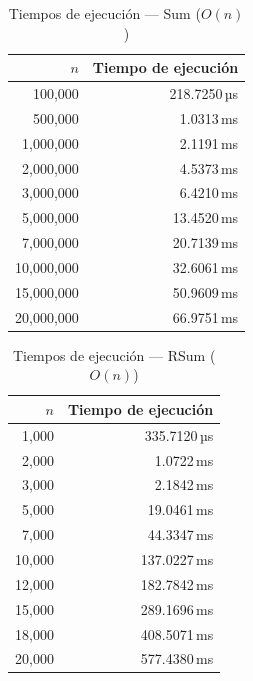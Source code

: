 \documentclass{article}
\begin{document}
\begin{table}[ht]
  \centering
  \caption{Tiempos de ejecución — Sum ($O(n)$)}
  \label{tab:sum}
  \begin{tabular}{rr}
    \toprule
    $n$ & Tiempo de ejecución \\
    \midrule
    100,000 & 218.7250\,µs \\
    500,000 & 1.0313\,ms \\
    1,000,000 & 2.1191\,ms \\
    2,000,000 & 4.5373\,ms \\
    3,000,000 & 6.4210\,ms \\
    5,000,000 & 13.4520\,ms \\
    7,000,000 & 20.7139\,ms \\
    10,000,000 & 32.6061\,ms \\
    15,000,000 & 50.9609\,ms \\
    20,000,000 & 66.9751\,ms \\
    \bottomrule
  \end{tabular}
\end{table}

\begin{table}[ht]
  \centering
  \caption{Tiempos de ejecución — RSum ($O(n)$)}
  \label{tab:rsum}
  \begin{tabular}{rr}
    \toprule
    $n$ & Tiempo de ejecución \\
    \midrule
    1,000 & 335.7120\,µs \\
    2,000 & 1.0722\,ms \\
    3,000 & 2.1842\,ms \\
    5,000 & 19.0461\,ms \\
    7,000 & 44.3347\,ms \\
    10,000 & 137.0227\,ms \\
    12,000 & 182.7842\,ms \\
    15,000 & 289.1696\,ms \\
    18,000 & 408.5071\,ms \\
    20,000 & 577.4380\,ms \\
    \bottomrule
  \end{tabular}
\end{table}
\end{document}

